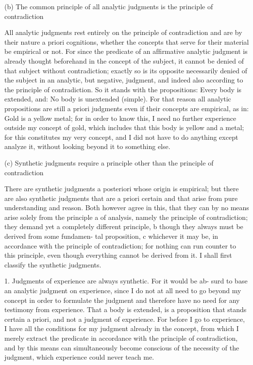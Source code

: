 (b) The common principle of all analytic judgments is
the principle of contradiction

All analytic judgments rest entirely on the principle of contradiction
and are by their nature a priori cognitions, whether the concepts that
serve for their material be empirical or not. For since the predicate
of an afﬁrmative analytic judgment is already thought beforehand in
the concept of the subject, it cannot be denied of that subject without
contradiction; exactly so is its opposite necessarily denied of the subject
in an analytic, but negative, judgment, and indeed also according to the
principle of contradiction. So it stands with the propositions: Every body
is extended, and: No body is unextended (simple).
For that reason all analytic propositions are still a priori judgments
even if their concepts are empirical, as in: Gold is a yellow metal; for
in order to know this, I need no further experience outside my concept
of gold, which includes that this body is yellow and a metal; for this
constitutes my very concept, and I did not have to do anything except
analyze it, without looking beyond it to something else.

(c) Synthetic judgments require a principle
other than the principle of contradiction

There are synthetic judgments a posteriori whose origin is empirical; but
there are also synthetic judgments that are a priori certain and that arise
from pure understanding and reason. Both however agree in this, that
they can by no means arise solely from the principle a of analysis, namely
the principle of contradiction; they demand yet a completely different
principle, b though they always must be derived from some fundamen-
tal proposition, c whichever it may be, in accordance with the principle of
contradiction; for nothing can run counter to this principle, even though
everything cannot be derived from it. I shall ﬁrst classify the synthetic
judgments.

1. Judgments of experience are always synthetic. For it would be ab-
surd to base an analytic judgment on experience, since I do not at all
need to go beyond my concept in order to formulate the judgment and
therefore have no need for any testimony from experience. That a body is
extended, is a proposition that stands certain a priori, and not a judgment
of experience. For before I go to experience, I have all the conditions
for my judgment already in the concept, from which I merely extract
the predicate in accordance with the principle of contradiction, and by
this means can simultaneously become conscious of the necessity of the
judgment, which experience could never teach me.

